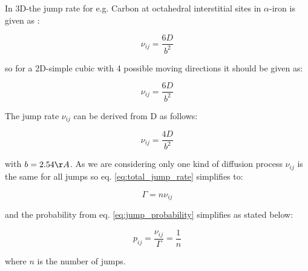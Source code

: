 In 3D-the jump rate for e.g. Carbon at octahedral interstitial sites in $\alpha$-iron is given as \cite{gottstein2004}:

\begin{equation}
	\nu_{ij} = \frac{6D}{b^{2}}
\end{equation}

so for a 2D-simple cubic with 4 possible moving directions it should be given as:

\begin{equation}
	\nu_{ij} = \frac{6D}{b^{2}}
\end{equation}

The jump rate \(\nu_{ij}\) can be derived from D as follows:

\begin{equation}
	\nu_{ij} = \frac{4D}{b^{2}}
\end{equation}

with \(b = 2.54 \AA \). As we are considering only one kind of diffusion process \(\nu_{ij}\) is the same for all jumps so eq. \ref{eq:total_jump_rate} simplifies to:

\begin{equation}
	\Gamma = n \nu_{ij}
\end{equation}

and the probability from eq. \ref{eq:jump_probability} simplifies as stated below:

\begin{equation}
	p_{ij} = \frac{\nu_{ij}}{\Gamma} = \frac{1}{n}
\end{equation}

where \(n\) is the number of jumps.

\printbibliography


